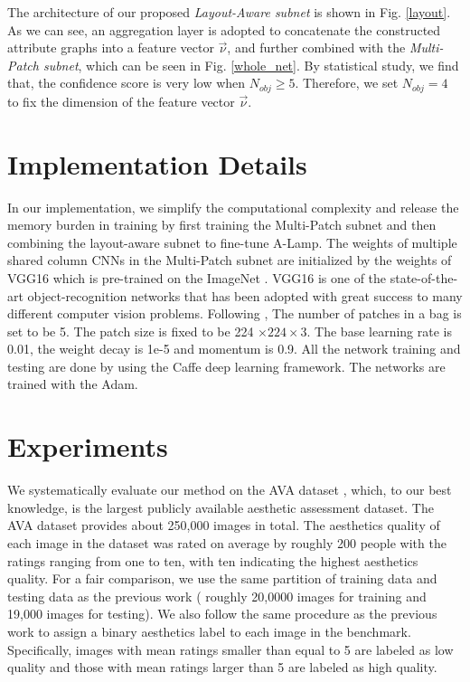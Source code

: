 \documentclass[10pt,twocolumn,letterpaper]{article}
\begin{document}
The architecture of our proposed \textit{Layout-Aware subnet} is shown in Fig. \ref{layout}. As we can see, an aggregation layer is adopted to concatenate the constructed attribute graphs into a feature vector ${\vec \nu }$, and further combined with the \textit{Multi-Patch subnet}, which can be seen in Fig. \ref{whole_net}. By statistical study, we find that, the confidence score is very low when ${N_{obj}} \ge 5$. Therefore, we set $N_{obj} = 4$ to fix the dimension of the feature vector ${\vec \nu }$.

\section{Implementation Details}
In our implementation, we simplify the computational complexity and release the memory burden in training by first training the Multi-Patch subnet and then combining the layout-aware subnet to fine-tune A-Lamp. 
The weights of multiple shared column CNNs in the Multi-Patch subnet are initialized by the weights of VGG16 which is pre-trained on the ImageNet \cite{Alex:2012:NIPS:ImageNet}. VGG16 is one of the state-of-the-art object-recognition networks that has been adopted with great success to many different computer vision problems. 
Following \cite{Lu:2015:ICCV}, The number of patches in a bag is set to be 5. The patch size is fixed to be 224 $ \times 224 \times 3$. The base learning rate is 0.01, the weight decay is 1e-5 and momentum is 0.9.  
All the network training and testing are done by using the Caffe deep learning framework\cite{Jia:2014:ACMMM:caffe}. The networks are trained with the Adam. 

\section{Experiments} \label{experiments}
We systematically evaluate our method on the AVA dataset \cite{Murray:MMP2012:AVA}, which, to our best knowledge, is the largest publicly available aesthetic assessment dataset. The AVA dataset provides about 250,000 images in total. The aesthetics quality of each image in the dataset was rated on average by roughly 200 people with the ratings ranging from one to ten, with ten indicating the highest aesthetics quality. For a fair comparison, we use the same partition of training data and testing data as the previous
work \cite{Lu:2014:ACMMM,Lu:2015:ICCV,Mai:2016:CVPR,Murray:MMP2012:AVA} ( roughly 20,0000 images for training and 19,000 images for testing). We also follow the same procedure as the previous work to assign a binary aesthetics label to each image in the benchmark. Specifically, images with mean ratings smaller than equal to 5 are labeled as low quality and those with mean ratings larger than 5 are labeled as high quality. 
\end{document}
